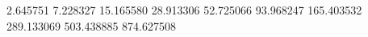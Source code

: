 2.645751
7.228327
15.165580
28.913306
52.725066
93.968247
165.403532
289.133069
503.438885
874.627508

